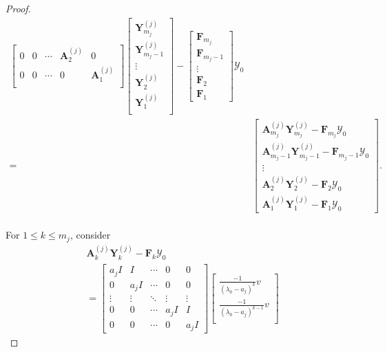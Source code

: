 \documentclass[12pt, reqno]{amsart}
\theoremstyle{definition}
\theoremstyle{remark}
\numberwithin{equation}{section}
\begin{document}
\begin{proof}
\begin{align*}
\begin{bmatrix}
    0 & 0 & \cdots & \textbf{A}_{2}^{(j)} & 0 \\
    0 & 0 & \cdots & 0 & \textbf{A}_{1}^{(j)} \\
\end{bmatrix} \begin{bmatrix}
    \textbf{Y}_{m_j}^{(j)} \\
    \textbf{Y}_{m_j -1}^{(j)} \\
    \vdots \\
    \textbf{Y}_{2}^{(j)} \\
    \textbf{Y}_{1}^{(j)}\\
\end{bmatrix}- \begin{bmatrix}
    \textbf{F}_{m_j} \\
    \textbf{F}_{m_j-1} \\
    \vdots \\
    \textbf{F}_2\\
    \textbf{F}_1
\end{bmatrix}\mathcal{Y}_0\\ 
=& \begin{bmatrix}
    \textbf{A}_{m_j}^{(j)}\textbf{Y}_{m_j}^{(j)}-\textbf{F}_{m_j}\mathcal{Y}_0\\
    \textbf{A}_{m_j-1}^{(j)}\textbf{Y}_{m_j-1}^{(j)}-\textbf{F}_{m_j-1}\mathcal{Y}_0\\
    \vdots\\
    \textbf{A}_2^{(j)}\textbf{Y}_2^{(j)}-\textbf{F}_2\mathcal{Y}_0\\
    \textbf{A}_1^{(j)}\textbf{Y}_1^{(j)}-\textbf{F}_1\mathcal{Y}_0
\end{bmatrix}.
\end{align*} \\
For $1 \leq k \leq m_j$, consider 
\begin{align*}
& \textbf{A}_k^{(j)}\textbf{Y}_k^{(j)}-\textbf{F}_k\mathcal{Y}_0 \nonumber\\
& = \begin{bmatrix}
    a_jI & I & \cdots & 0 & 0 \\
    0 & a_jI  & \cdots & 0 & 0 \\
    \vdots & \vdots & \ddots & \vdots & \vdots \\
    0 & 0 & \cdots & a_jI & I \\
    0 & 0 & \cdots & 0 & a_jI
\end{bmatrix} \begin{bmatrix}
    \frac{-1}{(\lambda_0-a_j)^k} v\\
    \frac{-1}{(\lambda_0-a_j)^{k-1}} v\\

\end{bmatrix}
\end{align*}
\end{proof}
\end{document}
